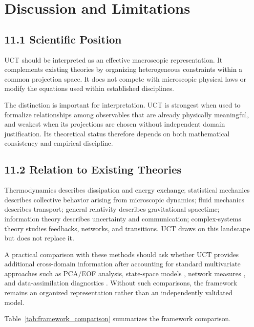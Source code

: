 ﻿\section{Discussion and Limitations}


\subsection{11.1 Scientific Position}

UCT should be interpreted as an effective macroscopic representation. It complements existing theories by organizing heterogeneous constraints within a common projection space. It does not compete with microscopic physical laws or modify the equations used within established disciplines.

The distinction is important for interpretation. UCT is strongest when used to formalize relationships among observables that are already physically meaningful, and weakest when its projections are chosen without independent domain justification. Its theoretical status therefore depends on both mathematical consistency and empirical discipline.

\subsection{11.2 Relation to Existing Theories}

Thermodynamics describes dissipation and energy exchange; statistical mechanics describes collective behavior arising from microscopic dynamics; fluid mechanics describes transport; general relativity describes gravitational spacetime; information theory describes uncertainty and communication; complex-systems theory studies feedbacks, networks, and transitions. UCT draws on this landscape but does not replace it.

A practical comparison with these methods should ask whether UCT provides additional cross-domain information after accounting for standard multivariate approaches such as PCA/EOF analysis, state-space models \cite{Kalman1960}, network measures \cite{Barabasi2016,Boccaletti2014Multilayer,Kivela2014Multilayer}, and data-assimilation diagnostics \cite{Kalnay2003Assimilation}. Without such comparisons, the framework remains an organized representation rather than an independently validated model.

Table~\ref{tab:framework_comparison} summarizes the framework comparison.



